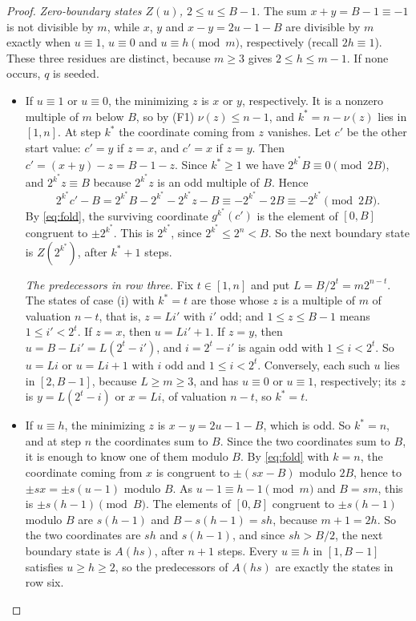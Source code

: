 \documentclass[11pt]{amsart}
\theoremstyle{definition}
\theoremstyle{remark}
\newcommand{\vt}{\nu}
\begin{document}
\begin{proof}
\emph{Zero-boundary states $Z(u)$, $2\le u\le B-1$.} The sum $x+y=B-1\equiv-1$ is not divisible by $m$, while $x$, $y$ and $x-y=2u-1-B$ are divisible by $m$ exactly when $u\equiv1$, $u\equiv0$ and $u\equiv h\pmod m$, respectively (recall $2h\equiv1$). These three residues are distinct, because $m\ge3$ gives $2\le h\le m-1$. If none occurs, $q$ is seeded.
\begin{itemize}
\item[(i)] If $u\equiv1$ or $u\equiv0$, the minimizing $z$ is $x$ or $y$, respectively. It is a nonzero multiple of $m$ below $B$, so by (F1) $\vt(z)\le n-1$, and $k^*=n-\vt(z)$ lies in $[1,n]$. At step $k^*$ the coordinate coming from $z$ vanishes. Let $c'$ be the other start value: $c'=y$ if $z=x$, and $c'=x$ if $z=y$. Then $c'=(x+y)-z=B-1-z$. Since $k^*\ge1$ we have $2^{k^*}B\equiv0\pmod{2B}$, and $2^{k^*}z\equiv B$ because $2^{k^*}z$ is an odd multiple of $B$. Hence
\[
2^{k^*}c'-B=2^{k^*}B-2^{k^*}-2^{k^*}z-B\equiv-2^{k^*}-2B\equiv-2^{k^*}\pmod{2B}.
\]
By \eqref{eq:fold}, the surviving coordinate $g^{k^*}(c')$ is the element of $[0,B]$ congruent to $\pm2^{k^*}$. This is $2^{k^*}$, since $2^{k^*}\le2^n<B$. So the next boundary state is $Z(2^{k^*})$, after $k^*+1$ steps.

\emph{The predecessors in row three.} Fix $t\in[1,n]$ and put $L=B/2^t=m2^{n-t}$. The states of case (i) with $k^*=t$ are those whose $z$ is a multiple of $m$ of valuation $n-t$, that is, $z=Li'$ with $i'$ odd; and $1\le z\le B-1$ means $1\le i'<2^t$. If $z=x$, then $u=Li'+1$. If $z=y$, then $u=B-Li'=L(2^t-i')$, and $i=2^t-i'$ is again odd with $1\le i<2^t$. So $u=Li$ or $u=Li+1$ with $i$ odd and $1\le i<2^t$. Conversely, each such $u$ lies in $[2,B-1]$, because $L\ge m\ge3$, and has $u\equiv0$ or $u\equiv1$, respectively; its $z$ is $y=L(2^t-i)$ or $x=Li$, of valuation $n-t$, so $k^*=t$.

\item[(ii)] If $u\equiv h$, the minimizing $z$ is $x-y=2u-1-B$, which is odd. So $k^*=n$, and at step $n$ the coordinates sum to $B$. Since the two coordinates sum to $B$, it is enough to know one of them modulo $B$. By \eqref{eq:fold} with $k=n$, the coordinate coming from $x$ is congruent to $\pm(sx-B)$ modulo $2B$, hence to $\pm sx=\pm s(u-1)$ modulo $B$. As $u-1\equiv h-1\pmod m$ and $B=sm$, this is $\pm s(h-1)\pmod B$. The elements of $[0,B]$ congruent to $\pm s(h-1)$ modulo $B$ are $s(h-1)$ and $B-s(h-1)=sh$, because $m+1=2h$. So the two coordinates are $sh$ and $s(h-1)$, and since $sh>B/2$, the next boundary state is $A(hs)$, after $n+1$ steps. Every $u\equiv h$ in $[1,B-1]$ satisfies $u\ge h\ge2$, so the predecessors of $A(hs)$ are exactly the states in row six.
\end{itemize}


\end{proof}
\end{document}
